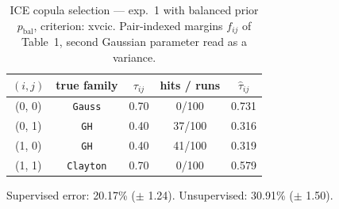 \begin{table}[htbp]
  \centering
  \caption{ICE copula selection — exp.\ 1 with balanced prior $p_{\text{bal}}$, criterion: xvcic. Pair-indexed margins $f_{ij}$ of Table~1, second Gaussian parameter read as a variance.}
  \label{tab:exp3-exp1_bal_p__xvcic}
  \begin{tabular}{ccccc}
    \toprule
    $(i, j)$ & true family & $\tau_{ij}$ & hits / runs & $\hat\tau_{ij}$ \\
    \midrule
    (0, 0) & \texttt{Gauss} & 0.70 & 0/100 & 0.731 \\
    (0, 1) & \texttt{GH} & 0.40 & 37/100 & 0.316 \\
    (1, 0) & \texttt{GH} & 0.40 & 41/100 & 0.319 \\
    (1, 1) & \texttt{Clayton} & 0.70 & 0/100 & 0.579 \\
    \bottomrule
  \end{tabular}
  \par\smallskip Supervised error: 20.17\% ($\pm$ 1.24). Unsupervised: 30.91\% ($\pm$ 1.50).
\end{table}
